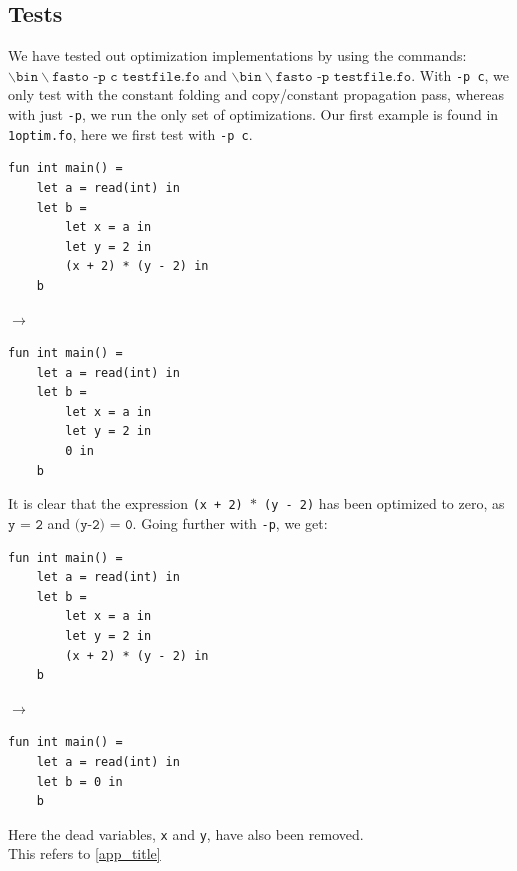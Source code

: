 \documentclass[11pt]{article}
\begin{document}
	\subsection{Tests}
	We have tested out optimization implementations by using the commands: \\
	$\backslash \texttt{bin}\backslash \texttt{fasto -p c testfile.fo}$ and
	$\backslash \texttt{bin}\backslash \texttt{fasto -p testfile.fo}$. With \texttt{-p c}, we only test with the constant folding and
	copy/constant propagation pass, whereas with just \texttt{-p}, we run the only set of optimizations. Our first example is found in \texttt{1optim.fo}, here we first test with \texttt{-p c}.\medskip\\
	\begin{center}
	\begin{minipage}{.5\textwidth}
	\begin{lstlisting}
fun int main() =
    let a = read(int) in
    let b =
        let x = a in
        let y = 2 in
        (x + 2) * (y - 2) in
    b

	\end{lstlisting}
	\end{minipage}%
	\begin{minipage}{.1\textwidth}
	$\rightarrow$
	\end{minipage}%
	\begin{minipage}{.4\textwidth}
	\begin{lstlisting}
fun int main() =
    let a = read(int) in
    let b =
        let x = a in
        let y = 2 in
        0 in
    b
	\end{lstlisting}
	\end{minipage}
	\end{center}
	It is clear that the expression \texttt{(x + 2) $\ast$ (y - 2)} has been optimized to zero, as $\texttt{y = 2}$
	and $\texttt{(y-2) = 0}$. Going further with \texttt{-p}, we get:
	\begin{center}
	\begin{minipage}{.5\textwidth}
	\begin{lstlisting}
fun int main() =
    let a = read(int) in
    let b =
        let x = a in
        let y = 2 in
        (x + 2) * (y - 2) in
    b

	\end{lstlisting}
	\end{minipage}%
	\begin{minipage}{.1\textwidth}
	$\rightarrow$
	\end{minipage}%
	\begin{minipage}{.4\textwidth}
	\begin{lstlisting}
fun int main() =
    let a = read(int) in
    let b = 0 in
    b
	\end{lstlisting}
	\end{minipage}
	\end{center}
	Here the dead variables, \texttt{x} and \texttt{y}, have also been removed. \\
    This refers to \ref{app_title}
\end{document}
